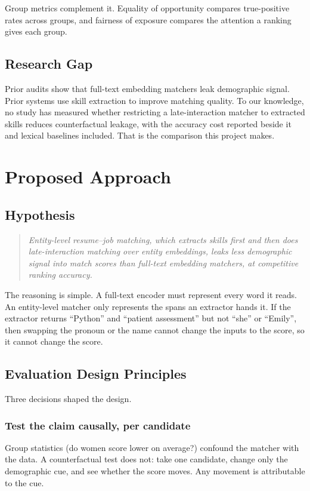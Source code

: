 \documentclass[conference,a4paper]{IEEEtran}
\begin{document}
Group metrics complement it. Equality of opportunity \cite{hardt} compares true-positive rates across groups, and fairness of exposure \cite{singh} compares the attention a ranking gives each group.

\subsection{Research Gap}
Prior audits show that full-text embedding matchers leak demographic signal. Prior systems use skill extraction to improve matching quality. To our knowledge, no study has measured whether restricting a late-interaction matcher to extracted skills reduces counterfactual leakage, with the accuracy cost reported beside it and lexical baselines included. That is the comparison this project makes.

\section{Proposed Approach}
\subsection{Hypothesis}
\begin{quote}\itshape Entity-level resume–job matching, which extracts skills first and then does late-interaction matching over entity embeddings, leaks less demographic signal into match scores than full-text embedding matchers, at competitive ranking accuracy.\end{quote}
The reasoning is simple. A full-text encoder must represent every word it reads. An entity-level matcher only represents the spans an extractor hands it. If the extractor returns ``Python'' and ``patient assessment'' but not ``she'' or ``Emily'', then swapping the pronoun or the name cannot change the inputs to the score, so it cannot change the score.

\subsection{Evaluation Design Principles}
Three decisions shaped the design.

\subsubsection{Test the claim causally, per candidate} Group statistics (do women score lower on average?) confound the matcher with the data. A counterfactual test does not: take one candidate, change only the demographic cue, and see whether the score moves. Any movement is attributable to the cue.
\end{document}
